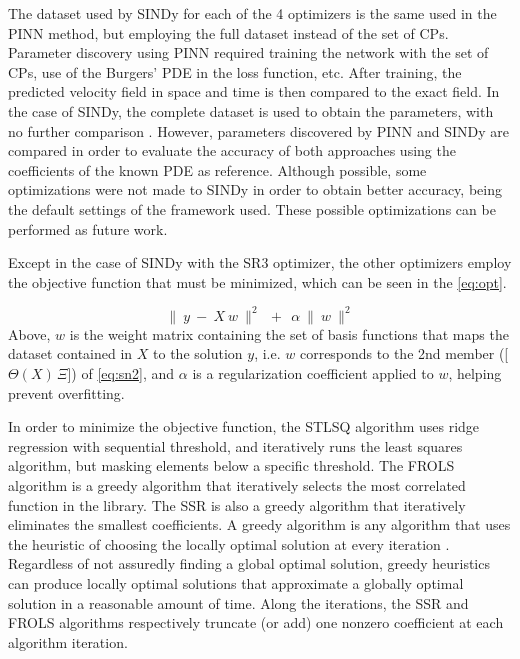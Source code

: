 \documentclass[conference]{IEEEtran}
\begin{document}
The dataset used by SINDy for each of the 4 optimizers is the same used in the PINN method, but employing the full dataset instead of the set of CPs. Parameter discovery using PINN required training the network with the set of CPs, use of the Burgers' PDE in the loss function, etc. After training, the predicted velocity field in space and time is then compared to the exact field. In the case of SINDy,
the complete dataset is used to obtain the parameters, with no further comparison \cite{Brunton2016}. However, parameters discovered by PINN and SINDy are compared in order to evaluate the accuracy of both approaches using the coefficients of the known PDE as reference.
Although possible, some optimizations were not made to SINDy in order to obtain better accuracy, being the default settings of the framework used. These possible optimizations can be performed as future work.

Except in the case of SINDy with the SR3 optimizer, the other optimizers employ the objective function that must be minimized, which can be seen in the \autoref{eq:opt}.

\begin{minipage}[htb]{.95\columnwidth}\bigskip\begin{equation}
\| \ y \ - \ X \ w \ \|^2 \ \ + \ \ \alpha \ \| \ w \ \|^2
\label{eq:opt}\end{equation}
Above, $w$ is the weight matrix containing the set of basis functions that maps the dataset contained in $X$ to the solution $y$, i.e. $w$ corresponds to the 2nd member ([$\Theta(X)\,\Xi$]) of \autoref{eq:sn2}, and $\alpha$ is a regularization coefficient applied to $w$, helping prevent overfitting.
\bigskip\end{minipage}%





In order to minimize the objective function, the STLSQ \cite{Brunton2016} algorithm uses ridge regression with sequential threshold, and iteratively runs the least squares algorithm, but masking elements below a specific threshold. The FROLS \cite{Billings2013} algorithm is a greedy algorithm that iteratively selects the most correlated function in the library. The SSR \cite{Boninsegna2018} is also a greedy algorithm that iteratively eliminates the smallest coefficients. A greedy algorithm is any algorithm that uses the heuristic of choosing the locally optimal solution at every iteration \cite{Black2005}. Regardless of not assuredly finding a global optimal solution, greedy heuristics can produce locally optimal solutions that approximate a globally optimal solution in a reasonable amount of time. Along the iterations, the SSR and FROLS algorithms respectively truncate (or add) one nonzero coefficient at each algorithm iteration.
\end{document}
